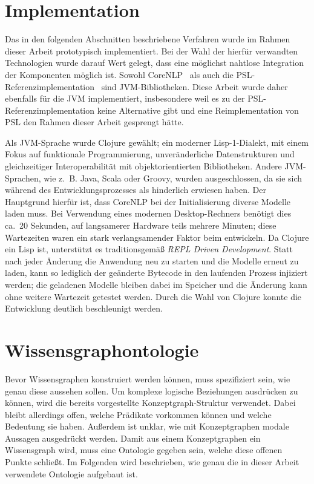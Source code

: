 \section{Implementation}%
\label{sec:text2kg:implementation}

Das in den folgenden Abschnitten beschriebene Verfahren wurde im Rahmen dieser Arbeit prototypisch implementiert.
Bei der Wahl der hierfür verwandten Technologien wurde darauf Wert gelegt, dass eine möglichst nahtlose Integration der Komponenten möglich ist.
Sowohl CoreNLP~\cite{CoreNLP} als auch die PSL-Referenzimplementation~\cite{PSL} sind JVM-Bibliotheken.
Diese Arbeit wurde daher ebenfalls für die JVM implementiert, insbesondere weil es zu der PSL-Referenzimplementation keine Alternative gibt und eine Reimplementation von PSL den Rahmen dieser Arbeit gesprengt hätte.

Als JVM-Sprache wurde Clojure gewählt; ein moderner Lisp-1-Dialekt, mit einem Fokus auf funktionale Programmierung, unveränderliche Datenstrukturen und gleichzeitiger Interoperabilität mit objektorientierten Bibliotheken.
Andere JVM-Sprachen, wie z.~B. Java, Scala oder Groovy, wurden ausgeschlossen, da sie sich während des Entwicklungsprozesses als hinderlich erwiesen haben.
Der Hauptgrund hierfür ist, dass CoreNLP bei der Initialisierung diverse Modelle laden muss.
Bei Verwendung eines modernen Desktop-Rechners benötigt dies ca.~20 Sekunden, auf langsamerer Hardware teils mehrere Minuten;
diese Wartezeiten waren ein stark verlangsamender Faktor beim entwickeln.
Da Clojure ein Lisp ist, unterstützt es traditionsgemäß \textit{REPL Driven Development}.
Statt nach jeder Änderung die Anwendung neu zu starten und die Modelle erneut zu laden, kann so lediglich der geänderte Bytecode in den laufenden Prozess injiziert werden;
die geladenen Modelle bleiben dabei im Speicher und die Änderung kann ohne weitere Wartezeit getestet werden.
Durch die Wahl von Clojure konnte die Entwicklung deutlich beschleunigt werden.

\section{Wissensgraphontologie}%
\label{sec:text2kg:ontology}

Bevor Wissensgraphen konstruiert werden können, muss spezifiziert sein, wie genau diese aussehen sollen.
Um komplexe logische Beziehungen ausdrücken zu können, wird die bereits vorgestellte Konzeptgraph-Struktur verwendet.
Dabei bleibt allerdings offen, welche Prädikate vorkommen können und welche Bedeutung sie haben.
Außerdem ist unklar, wie mit Konzeptgraphen modale Aussagen ausgedrückt werden.
Damit aus einem Konzeptgraphen ein Wissensgraph wird, muss eine Ontologie gegeben sein, welche diese offenen Punkte schließt.
Im Folgenden wird beschrieben, wie genau die in dieser Arbeit verwendete Ontologie aufgebaut ist.

